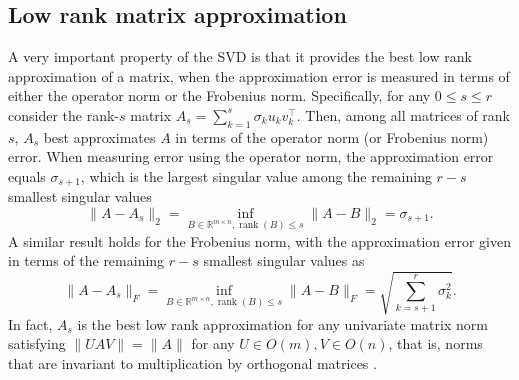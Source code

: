 \subsection{Low rank matrix approximation}\label{ss:lowranksvd}


A very important property of the SVD is that it provides the best low rank approximation of a matrix, when the approximation error is measured in terms of either the operator norm or the Frobenius norm. Specifically, for any $0 \leq s \leq r$ consider the rank-$s$ matrix $A_s = \sum_{k=1}^s \sigma_k u_k v_k^\top  $. Then, among all matrices of rank $s$, $A_s$ best approximates $A$ in terms of the operator norm (or Frobenius norm) error. When measuring error using the operator norm, the approximation error equals $\sigma_{s+1}$, which is the largest singular value among the remaining $r-s$ smallest singular values
\begin{equation}
\|A - A_s \|_2 = \inf_{B \in \mathbb{R}^{m\times n}, \operatorname{rank}(B) \leq s} \|A - B \|_2 = \sigma_{s+1}.
\end{equation}
A similar result holds for the Frobenius norm, with the approximation error given in terms of the remaining $r-s$ smallest singular values as
\begin{equation}
\|A - A_s \|_F = \inf_{B \in \mathbb{R}^{m\times n}, \operatorname{rank}(B) \leq s} \|A - B \|_F = \sqrt{\sum_{k=s+1}^r \sigma_k^2}.
\end{equation}
In fact, $A_s$ is the best low rank approximation for any univariate matrix norm satisfying $\|U A V\| = \| A \|$ for any $U \in O(m), V\in O(n)$, that is, norms that are invariant to multiplication by orthogonal matrices \cite{mirsky1960symmetric}.

